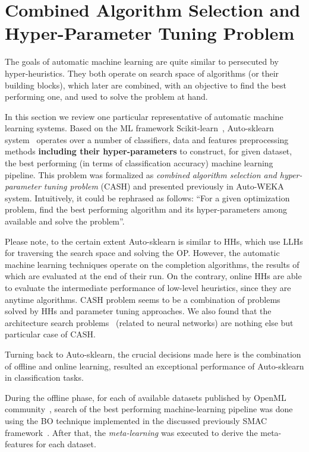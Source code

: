 \section{Combined Algorithm Selection and Hyper-Parameter Tuning Problem}\label{bg: section cash}
The goals of automatic machine learning are quite similar to persecuted by hyper-heuristics. They both operate on search space of algorithms (or their building blocks), which later are combined, with an objective to find the best performing one, and used to solve the problem at hand. 

In this section we review one particular representative of automatic machine learning systems.
Based on the ML framework Scikit-learn~\cite{scikit-learn}, Auto-sklearn system~\cite{feurer2015efficient} operates over a number of classifiers, data and features preprocessing methods \textbf{including their hyper-parameters} to construct, for given dataset, the best performing (in terms of classification accuracy) machine learning pipeline.
This problem was formalized as \textit{combined algorithm selection and hyper-parameter tuning problem} (CASH) and presented previously in Auto-WEKA~\cite{thornton2013auto} system. Intuitively, it could be rephrased as follows: ``For a given optimization problem, find the best performing algorithm and its hyper-parameters among available and solve the problem''. 

Please note, to the certain extent Auto-sklearn is similar to HHs, which use LLHs for traversing the search space and solving the OP. However, the automatic machine learning techniques operate on the completion algorithms, the results of which are evaluated at the end of their run. On the contrary, online HHs are able to evaluate the intermediate performance of low-level heuristics, since they are anytime algorithms.
CASH problem seems to be a combination of problems solved by HHs and parameter tuning approaches. We also found that the architecture search problems~\cite{elsken2018neural} (related to neural networks) are nothing else but particular case of CASH.


Turning back to Auto-sklearn, the crucial decisions made here is the combination of offline and online learning, resulted an exceptional performance of Auto-sklearn in classification tasks.

During the offline phase, for each of available datasets published by OpenML community~\cite{OpenMLPython2019}, search of the best performing machine-learning pipeline was done using the BO technique implemented in the discussed previously SMAC framework~\cite{hutter2011sequential}.
After that, the \textit{meta-learning} was executed to derive the meta-features for each dataset.

